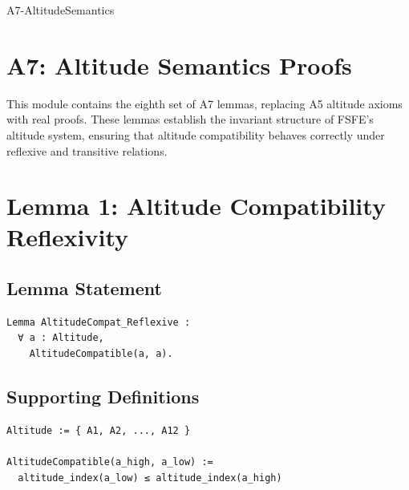 \documentclass[11pt]{article}
\begin{document}


\begin{citationmembrane}{A7-AltitudeSemantics}
\end{citationmembrane}

\section*{A7: Altitude Semantics Proofs}

This module contains the eighth set of A7 lemmas, replacing A5 altitude axioms
with real proofs. These lemmas establish the invariant structure of FSFE’s
altitude system, ensuring that altitude compatibility behaves correctly under
reflexive and transitive relations.

\newpage


\section{Lemma 1: Altitude Compatibility Reflexivity}

\subsection{Lemma Statement}

\begin{verbatim}
Lemma AltitudeCompat_Reflexive :
  ∀ a : Altitude,
    AltitudeCompatible(a, a).
\end{verbatim}

\subsection{Supporting Definitions}

\begin{verbatim}
Altitude := { A1, A2, ..., A12 }

AltitudeCompatible(a_high, a_low) :=
  altitude_index(a_low) ≤ altitude_index(a_high)
\end{verbatim}
\end{document}
